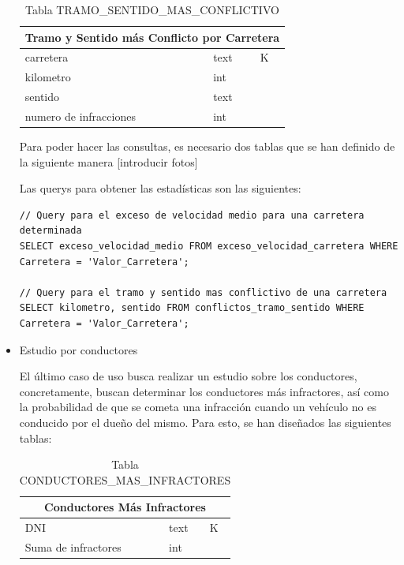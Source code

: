 \documentclass[]{article}
\begin{document}
\begin{itemize}
    \begin{table}[H]
        \centering
        \begin{tabular}{lll} 
            \toprule
            \multicolumn{3}{c}{\large\textbf{Tramo y Sentido más Conflicto por Carretera}} \\ 
            \midrule
            carretera     & text & K\\
            kilometro     & int & \\
            sentido       & text& \\
            numero de infracciones & int & \\
            \bottomrule
        \end{tabular}
        \caption {Tabla TRAMO\_SENTIDO\_MAS\_CONFLICTIVO}
    \end{table}
    

    Para poder hacer las consultas, es necesario dos tablas que se han definido de la siguiente manera [introducir fotos]

    Las querys para obtener las estadísticas son las siguientes:

    \begin{lstlisting}[language=cql, caption=Querys para el caso de uso 2]
// Query para el exceso de velocidad medio para una carretera determinada
SELECT exceso_velocidad_medio FROM exceso_velocidad_carretera WHERE Carretera = 'Valor_Carretera';

// Query para el tramo y sentido mas conflictivo de una carretera
SELECT kilometro, sentido FROM conflictos_tramo_sentido WHERE Carretera = 'Valor_Carretera';
    \end{lstlisting}
 
    \item Estudio por conductores

    El último caso de uso busca realizar un estudio sobre los conductores, concretamente, buscan determinar los conductores más infractores, así como la probabilidad de que se cometa una infracción cuando un vehículo no es conducido por el dueño del mismo. Para esto, se han diseñados las siguientes tablas: 

    \begin{table}[H]
        \centering
        \begin{tabular}{lll} 
            \toprule
            \multicolumn{3}{c}{\large\textbf{Conductores Más Infractores}} \\ 
            \midrule
            DNI       & text & K\\
            Suma de infractores     & int & \\
            \bottomrule
        \end{tabular}
        \caption {Tabla CONDUCTORES\_MAS\_INFRACTORES}
     \end{table}


\end{itemize}
\end{document}

